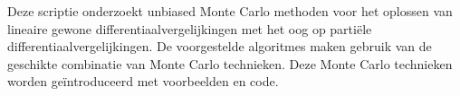 Deze scriptie onderzoekt unbiased Monte Carlo methoden voor
het oplossen van lineaire gewone differentiaalvergelijkingen met het
oog op partiële differentiaalvergelijkingen.
De voorgestelde algoritmes maken gebruik van de geschikte
combinatie van Monte Carlo technieken. Deze Monte Carlo technieken
worden geïntroduceerd met voorbeelden en code.